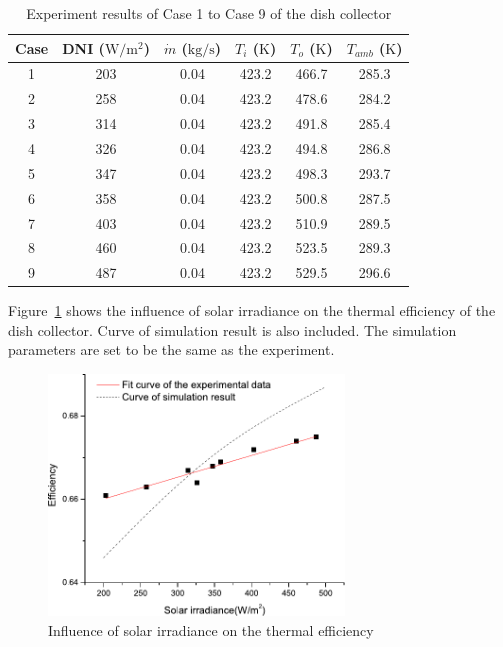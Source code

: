 \begin{table}[htbp]\footnotesize
	\caption{Experiment results of Case 1 to Case 9 of the dish collector}
	\begin{center}
	\begin{tabular}{cccccc}
		\toprule
		Case	& DNI ($\mathrm{W/m^2}$)	&	$\dot{m}$ ($\mathrm{kg/s}$)			&	$T_i$ ($\mathrm{K}$)	&	$T_o$ ($\mathrm{K}$)		&	$T_{amb}$ ($\mathrm{K}$)\\
		\midrule
		1	&	203	&	0.04	&	423.2	&	466.7	&	285.3\\
		2	&	258	&	0.04	&	423.2	&	478.6	&	284.2\\
		3	&	314	&	0.04	&	423.2	&	491.8	&	285.4	\\
		4	&	326	&	0.04	&	423.2	&	494.8	&	286.8\\
		5	&	347	&	0.04	&	423.2	&	498.3	&	293.7\\
		6	&	358	&	0.04	&	423.2	&	500.8	&	287.5\\
		7	&	403	&	0.04	&	423.2	&	510.9	&	289.5\\
		8	&	460	&	0.04	&	423.2	&	523.5	&	289.3\\
		9	&	487	&	0.04	&	423.2	&	529.5	&	296.6\\
		\bottomrule
	\end{tabular}
	\end{center}
	\label{tab:ResultOfDish1}
\end{table}

Figure~\ref{fig:I_r-eta} shows the influence of solar irradiance on the thermal efficiency of the dish collector. Curve of simulation result is also included. The simulation parameters are set to be the same as the experiment. 
\begin{figure}[!ht]
\centering
\includegraphics[width=0.7\textwidth]{fig/I_r-eta}
\caption{Influence of solar irradiance on the thermal efficiency}
\label{fig:I_r-eta}
\end{figure}

